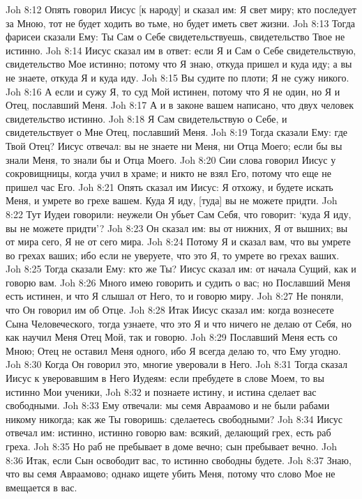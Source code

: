 Joh 8:12  Опять говорил Иисус [к народу] и сказал им: Я свет миру; кто последует за Мною, тот не будет ходить во тьме, но будет иметь свет жизни.
Joh 8:13  Тогда фарисеи сказали Ему: Ты Сам о Себе свидетельствуешь, свидетельство Твое не истинно.
Joh 8:14  Иисус сказал им в ответ: если Я и Сам о Себе свидетельствую, свидетельство Мое истинно; потому что Я знаю, откуда пришел и куда иду; а вы не знаете, откуда Я и куда иду.
Joh 8:15  Вы судите по плоти; Я не сужу никого.
Joh 8:16  А если и сужу Я, то суд Мой истинен, потому что Я не один, но Я и Отец, пославший Меня.
Joh 8:17  А и в законе вашем написано, что двух человек свидетельство истинно.
Joh 8:18  Я Сам свидетельствую о Себе, и свидетельствует о Мне Отец, пославший Меня.
Joh 8:19  Тогда сказали Ему: где Твой Отец? Иисус отвечал: вы не знаете ни Меня, ни Отца Моего; если бы вы знали Меня, то знали бы и Отца Моего.
Joh 8:20  Сии слова говорил Иисус у сокровищницы, когда учил в храме; и никто не взял Его, потому что еще не пришел час Его.
Joh 8:21  Опять сказал им Иисус: Я отхожу, и будете искать Меня, и умрете во грехе вашем. Куда Я иду, [туда] вы не можете придти.
Joh 8:22  Тут Иудеи говорили: неужели Он убьет Сам Себя, что говорит: `куда Я иду, вы не можете придти'?
Joh 8:23  Он сказал им: вы от нижних, Я от вышних; вы от мира сего, Я не от сего мира.
Joh 8:24  Потому Я и сказал вам, что вы умрете во грехах ваших; ибо если не уверуете, что это Я, то умрете во грехах ваших.
Joh 8:25  Тогда сказали Ему: кто же Ты? Иисус сказал им: от начала Сущий, как и говорю вам.
Joh 8:26  Много имею говорить и судить о вас; но Пославший Меня есть истинен, и что Я слышал от Него, то и говорю миру.
Joh 8:27  Не поняли, что Он говорил им об Отце.
Joh 8:28  Итак Иисус сказал им: когда вознесете Сына Человеческого, тогда узнаете, что это Я и что ничего не делаю от Себя, но как научил Меня Отец Мой, так и говорю.
Joh 8:29  Пославший Меня есть со Мною; Отец не оставил Меня одного, ибо Я всегда делаю то, что Ему угодно.
Joh 8:30  Когда Он говорил это, многие уверовали в Него.
Joh 8:31  Тогда сказал Иисус к уверовавшим в Него Иудеям: если пребудете в слове Моем, то вы истинно Мои ученики,
Joh 8:32  и познаете истину, и истина сделает вас свободными.
Joh 8:33  Ему отвечали: мы семя Авраамово и не были рабами никому никогда; как же Ты говоришь: сделаетесь свободными?
Joh 8:34  Иисус отвечал им: истинно, истинно говорю вам: всякий, делающий грех, есть раб греха.
Joh 8:35  Но раб не пребывает в доме вечно; сын пребывает вечно.
Joh 8:36  Итак, если Сын освободит вас, то истинно свободны будете.
Joh 8:37  Знаю, что вы семя Авраамово; однако ищете убить Меня, потому что слово Мое не вмещается в вас.

